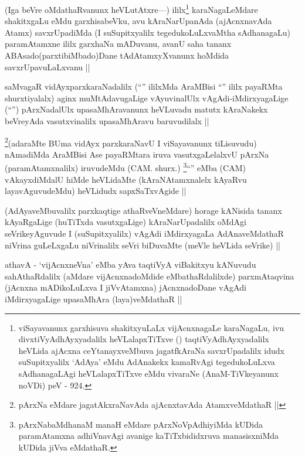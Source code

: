 \begin{artha}
(Iga beVre oMdathaRvanunx heVLutAtxre---) ililx\footnote{viSayavanunx garxhisuva shakitxyuLaLx vijAcnxnagaLe karaNagaLu, ivu divxtiVyAdhAyxyadalilx heVLalapxTiTxve (\quad) taqtiVyAdhAyxyadalilx heVLida ajAcxna ceYtanayxveMbuva jagatfkAraNa savxrUpadalilx idudx suSupitxyalilx `AdAya' eMdu AdAnakekx kamaRvAgi tegedukoLuLxva sAdhanagaLAgi heVLalapxTiTxve eMdu vivaraNe (AnaM-TiVkeyanunx noVDi) peV - 924.} karaNagaLeMdare shakitxgaLu eMdu garxhisabeVku, avu kAraNarUpanAda (ajAcnxnavAda Atamx) savxrUpadiMda (I suSupitxyalilx tegedukoLuLxvaMtha sAdhanagaLu) paramAtamxne ililx garxhaNa mADuvanu, avanU saha tananx ABAsado(parxtibiMbado)Dane tAdAtamxyXvanunx hoMdida savxrUpavuLaLxvanu ||
\end{artha}


\begin{artha}
saMvagaR vidAyxparxkaraNadalilx (``\stext'' ililxMda AraMBisi ``\stext'' ililx payaRMta shurxtiyalalx) aginx muMtAdavugaLige vAyuvinalUlx vAgAdi-iMdirxyagaLige (``\stext'') pArxNadalUlx upasaMhAravanunx heVLuvadu matutx kAraNakekx beVreyAda vasutxvinalilx upasaMhAravu baruvudilalx ||
\end{artha}

\begin{artha}
\footnote{pArxNa eMdare jagatAkxraNavAda ajAcnxtavAda AtamxveMdathaR ||}(adaraMte BUma vidAyx parxkaraNavU I viSayavanunx tiLisuvudu) nAmadiMda AraMBisi Ase payaRMtara iruva vasutxgaLelalxvU pArxNa (paramAtamxnalilx) iruvudeMdu (CAM. shurx.) \footnote{pArxNabaMdhanaM manaH eMdare pArxNoVpAdhiyiMda kUDida paramAtamxna adhiVnavAgi avanige kaTiTxbididxruva manasisxniMda kUDida jiVva eMdathaR.}``\stext'' eMba (CAM) vAkayxdiMdalU hiMde heVLidaMte (kAraNAtamxnalelx kAyaRvu layavAguvudeMdu) heVLidudx sapxSaTxvAgide ||
\end{artha}

\begin{artha}
(AdAyaveMbuvalilx parxkaqtige athaRveVneMdare) horage kANisida tananx kAyaRgaLige (huTiTxda vasutxgaLige) kAraNarUpadalilx oMdAgi seVrikeyAguvude I (suSupitxyalilx) vAgAdi iMdirxyagaLa AdAnaveMdathaR niVrina guLeLxgaLu niVrinalilx seVri biDuvaMte (meVle heVLida seVrike) ||
\end{artha}

\begin{artha}
athavA - `vijAcnxneVna' eMba yAva taqtiVyA viBakitxyu kANuvudu sahAthaRdalilx (aMdare vijAcnxnadoMdide eMbathaRdalilxde) parxmAtaqvina (jAcnxna mADikoLuLxva I jiVvAtamxna) jAcnxnadoDane vAgAdi iMdirxyagaLige upasaMhAra (laya)veMdathaR ||
\end{artha}

